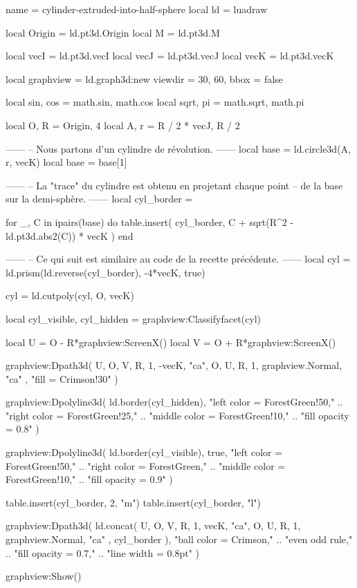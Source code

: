 \documentclass{standalone}
\begin{document}
\begin{luadraw*}{name = cylinder-extruded-into-half-sphere}
local ld = luadraw

local Origin = ld.pt3d.Origin
local M      = ld.pt3d.M

local vecI = ld.pt3d.vecI
local vecJ = ld.pt3d.vecJ
local vecK = ld.pt3d.vecK

local graphview = ld.graph3d:new{
  viewdir = {30, 60},
  bbox    = false
}

local sin, cos = math.sin, math.cos
local sqrt, pi = math.sqrt, math.pi

local O, R = Origin, 4
local A, r = R / 2 * vecJ, R / 2

------
-- Nous partons d'un cylindre de révolution.
------
local base = ld.circle3d(A, r, vecK)
local base = base[1]

------
-- La "trace" du cylindre est obtenu en projetant chaque point
-- de la base sur la demi-sphère.
------
local cyl_border = {}

for _, C in ipairs(base) do
  table.insert(
    cyl_border,
    C + sqrt(R^2 - ld.pt3d.abs2(C)) * vecK
  )
end

------
-- Ce qui suit est similaire au code de la recette précédente.
------
local cyl = ld.prism(ld.reverse(cyl_border), -4*vecK, true)

cyl = ld.cutpoly(cyl, {O, vecK})

local cyl_visible, cyl_hidden = graphview:Classifyfacet(cyl)

local U = O - R*graphview:ScreenX()
local V = O + R*graphview:ScreenX()

graphview:Dpath3d(
  {
    U, O, V, R, 1, -vecK, "ca",
    O, U, R, 1, graphview.Normal, "ca"
  },
  "fill = Crimson!30"
)

graphview:Dpolyline3d(
  ld.border(cyl_hidden),
     "left color = ForestGreen!50,"
  .. "right color = ForestGreen!25,"
  .. "middle color = ForestGreen!10,"
  .. "fill opacity = 0.8"
)

graphview:Dpolyline3d(
  ld.border(cyl_visible),
  true,
     "left color = ForestGreen!50,"
  .. "right color = ForestGreen,"
  .. "middle color = ForestGreen!10,"
  .. "fill opacity = 0.9"
)

table.insert(cyl_border, 2, "m")
table.insert(cyl_border, "l")

graphview:Dpath3d(
  ld.concat(
    {
      U, O, V, R, 1, vecK, "ca",
      O, U, R, 1, graphview.Normal, "ca"
    },
    cyl_border
  ),
     "ball color = Crimson,"
  .. "even odd rule,"
  .. "fill opacity = 0.7,"
  .. "line width = 0.8pt"
)

graphview:Show()
\end{luadraw*}
\end{document}
